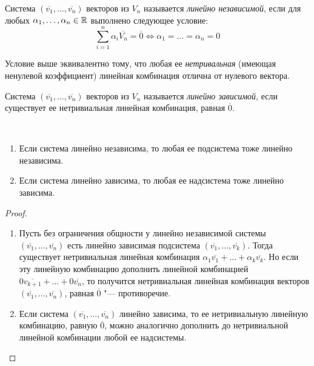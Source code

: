 \begin{definition}
	Система $(\overline{v_1}, \dots, \overline{v_n})$ векторов из $V_n$ называется \textit{линейно независимой}, если для любых $\alpha_1, \dotsc, \alpha_n \in \mathbb{R}$ выполнено следующее условие:
	\[\sum_{i = 1}^{n}\alpha_i\overline{V_n} = \overline{0} \Leftrightarrow \alpha_1 = \dots = \alpha_n = 0\]
\end{definition}

\begin{note}
	Условие выше эквивалентно тому, что любая ее \textit{нетривальная} (имеющая ненулевой коэффициент) линейная комбинация отлична от нулевого вектора.
\end{note}

\begin{definition}
	Система $(\overline{v_1}, \dots, \overline{v_n})$ векторов из $V_n$ называется \textit{линейно зависимой}, если существует ее нетривиальная линейная комбинация, равная $\overline{0}$.
\end{definition}

\begin{proposition}~
	\begin{enumerate}
		\item Если система линейно независима, то любая ее подсистема тоже линейно независима.
		\item Если система линейно зависима, то любая ее надсистема тоже линейно зависима.
	\end{enumerate}
\end{proposition}

\begin{proof}~
	\begin{enumerate}
		\item Пусть без ограничения общности у линейно независимой системы $(\overline{v_1}, \dots, \overline{v_n})$ есть линейно зависимая подсистема $(\overline{v_1}, \dots, \overline{v_k})$. Тогда существует нетривиальная линейная комбинация $\alpha_1\overline{v_1} + \dots + \alpha_k\overline{v_k}$. Но если эту линейную комбинацию дополнить линейной комбинацией $0\overline{v_{k+1}} + \dots + 0\overline{v_n}$, то получится нетривиальная линейная комбинация векторов $(\overline{v_1}, \dots, \overline{v_n})$, равная $\overline{0}$ "--- противоречие.
		
		\item Если система $(\overline{v_1}, \dots, \overline{v_n})$ линейно зависима, то ее нетривиальную линейную комбинацию, равную $\overline{0}$, можно аналогично дополнить до нетривиальной линейной комбинации любой ее надсистемы.\qedhere
	\end{enumerate}
\end{proof}

